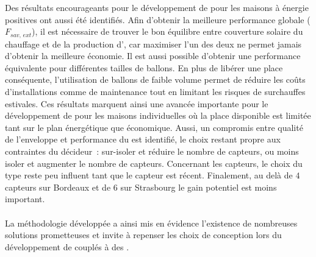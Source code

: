 Des résultats encourageants pour le développement de  pour les maisons à énergie
positives ont aussi été identifiés. Afin d’obtenir la meilleure performance globale
($F_{sav,\, ext}$), il est nécessaire de trouver le bon équilibre entre couverture solaire
du chauffage et de la production d’, car maximiser l’un des deux ne permet jamais
d’obtenir la meilleure économie. Il est aussi possible d’obtenir une performance
équivalente pour différentes tailles de ballons. En plus de libérer une place conséquente,
l’utilisation de ballons de faible volume permet de réduire les coûts d’installations comme
de maintenance tout en limitant les risques de surchauffes estivales. Ces résultats
marquent ainsi une avancée importante pour le développement de
 pour les maisons individuelles où la place disponible est limitée tant sur le
plan énergétique que économique.
Aussi, un compromis entre qualité de l’enveloppe et
performance du  est identifié, le choix restant propre aux contraintes du décideur~: sur-isoler
et réduire le nombre de capteurs, ou moins isoler et augmenter le nombre de capteurs.
Concernant les capteurs, le choix du type reste peu influent tant que le capteur
est récent. Finalement, au delà de $4$ capteurs sur Bordeaux et de $6$ sur Strasbourg le
gain potentiel est moins important.

\paragraph{} %
La méthodologie développée a ainsi mis en évidence l’existence de nombreuses solutions
prometteuses et invite à repenser les choix de conception lors du développement de
 couplés à des .
